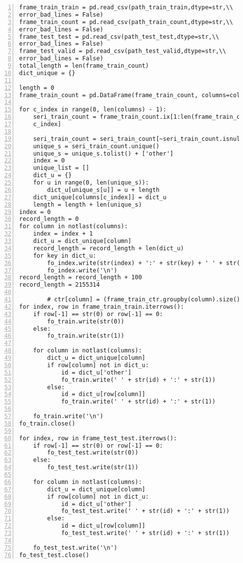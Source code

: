 \begin{lstlisting}[numbers=left, breaklines=true]
frame_train_train = pd.read_csv(path_train_train,dtype=str,\\
error_bad_lines = False)
frame_train_count = pd.read_csv(path_train_count,dtype=str,\\
error_bad_lines = False)
frame_test_test = pd.read_csv(path_test_test,dtype=str,\\
error_bad_lines = False)
frame_test_valid = pd.read_csv(path_test_valid,dtype=str,\\
error_bad_lines = False)
total_length = len(frame_train_count)
dict_unique = {}

length = 0
frame_train_count = pd.DataFrame(frame_train_count, columns=columns)

for c_index in range(0, len(columns) - 1):
    seri_train_count = frame_train_count.ix[1:len(frame_train_count)-1,\\
    c_index]

    seri_train_count = seri_train_count[~seri_train_count.isnull()]
    unique_s = seri_train_count.unique()
    unique_s = unique_s.tolist() + ['other']
    index = 0
    unique_list = []
    dict_u = {}
    for u in range(0, len(unique_s)):
        dict_u[unique_s[u]] = u + length
    dict_unique[columns[c_index]] = dict_u
    length = length + len(unique_s)
index = 0
record_length = 0
for column in notlast(columns):
    index = index + 1
    dict_u = dict_unique[column]
    record_length = record_length + len(dict_u)
    for key in dict_u:
        fo_index.write(str(index) + ':' + str(key) + ' ' + str(dict_u[key]))
        fo_index.write('\n')
record_length = record_length + 100
record_length = 2155314

        # ctr[column] = (frame_train_ctr.groupby(column).size()/float(count[column])).fillna(0)
for index, row in frame_train_train.iterrows():
    if row[-1] == str(0) or row[-1] == 0:
        fo_train.write(str(0))
    else:
        fo_train.write(str(1))

    for column in notlast(columns):
        dict_u = dict_unique[column]
        if row[column] not in dict_u:
            id = dict_u['other']
            fo_train.write(' ' + str(id) + ':' + str(1))
        else:
            id = dict_u[row[column]]
            fo_train.write(' ' + str(id) + ':' + str(1))

    fo_train.write('\n')
fo_train.close()

for index, row in frame_test_test.iterrows():
    if row[-1] == str(0) or row[-1] == 0:
        fo_test_test.write(str(0))
    else:
        fo_test_test.write(str(1))

    for column in notlast(columns):
        dict_u = dict_unique[column]
        if row[column] not in dict_u:
            id = dict_u['other']
            fo_test_test.write(' ' + str(id) + ':' + str(1))
        else:
            id = dict_u[row[column]]
            fo_test_test.write(' ' + str(id) + ':' + str(1))

    fo_test_test.write('\n')
fo_test_test.close()

\end{lstlisting}
